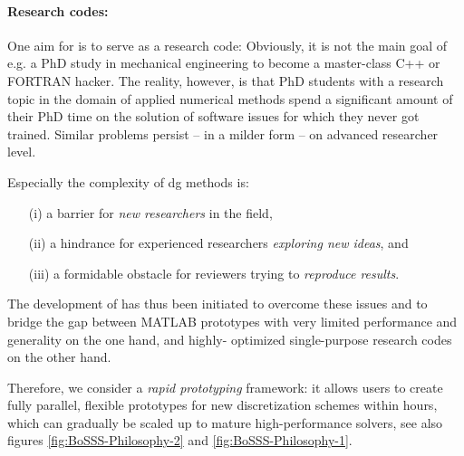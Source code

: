 \documentclass[a4paper,10pt]{report} %
\begin{document}
\paragraph{Research codes:}
One aim for \BoSSS{} is to serve as a research code: 
Obviously, it is not the main goal of e.g. a PhD study in mechanical engineering to become a 
master-class C++ or FORTRAN hacker. The reality, however, is that PhD students with a research topic in
the domain of applied numerical methods spend a significant amount of their PhD time on the solution
of software issues for which they never got trained. Similar problems persist – in a milder form – on
advanced researcher level.

Especially the complexity of \ac{dg} methods is:
\begin{itemize}
\item[(i)] a barrier for \emph{new researchers} in the field,

\item[(ii)] a hindrance for experienced researchers \emph{exploring new ideas}, and

\item[(iii)] a formidable obstacle for reviewers trying to \emph{reproduce results}.
\end{itemize}
The development of \BoSSS{} has thus been initiated to overcome these issues and to bridge the gap
between MATLAB prototypes with very limited performance and generality on the one hand, and highly-
optimized single-purpose research codes on the other hand.

Therefore, we consider \BoSSS{} a \emph{rapid prototyping} framework:
it allows users to create
fully parallel, flexible prototypes for new discretization schemes within hours, which can gradually be
scaled up to mature high-performance solvers,
see also figures \ref{fig:BoSSS-Philosophy-2} and \ref{fig:BoSSS-Philosophy-1}.
\end{document}
